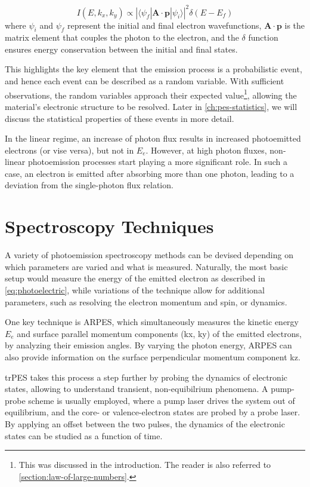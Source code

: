 \begin{equation}
    I(E, k_x, k_y) \propto |\langle \psi_f | \mathbf{A} \cdot \mathbf{p} | \psi_i \rangle|^2 \delta(E - E_f)
\end{equation}
where $\psi_i$ and $\psi_f$ represent the initial and final electron wavefunctions, $\mathbf{A} \cdot \mathbf{p}$ is the matrix element that couples the photon to the electron, and the $\delta$ function ensures energy conservation between the initial and final states.

This highlights the key element that the emission process is a probabilistic event, and hence each event can be described as a random variable. With sufficient observations, the random variables approach their expected value\footnote{This was discussed in the introduction. The reader is also referred to \cref{section:law-of-large-numbers}.}, allowing the material's electronic structure to be resolved. Later in \cref{ch:pes-statistics}, we will discuss the statistical properties of these events in more detail.

In the linear regime, an increase of photon flux results in increased photoemitted electrons (or vise versa), but not in $E_e$. However, at high photon fluxes, non-linear photoemission processes start playing a more significant role. In such a case, an electron is emitted after absorbing more than one photon, leading to a deviation from the single-photon flux relation. 

\section{Spectroscopy Techniques}\label{section:spectroscopy-techniques}
A variety of photoemission spectroscopy methods can be devised depending on which parameters are varied and what is measured. Naturally, the most basic setup would measure the energy of the emitted electron as described in \cref{eq:photoelectric}, while variations of the technique allow for additional parameters, such as resolving the electron momentum and spin, or dynamics.

One key technique is \gls{ARPES}, which simultaneously measures the kinetic energy $E_e$ and surface parallel momentum components (\gls{kx}, \gls{ky}) of the emitted electrons, by analyzing their emission angles. By varying the photon energy, \gls{ARPES} can also provide information on the surface perpendicular momentum component \gls{kz}. 

\Gls{trPES} takes this process a step further by probing the dynamics of electronic states, allowing to understand transient, non-equibilrium phenomena. A pump-probe scheme is usually employed, where a pump laser drives the system out of equilibrium, and the core- or valence-electron states are probed by a probe laser. By applying an offset between the two pulses, the dynamics of the electronic states can be studied as a function of time.

